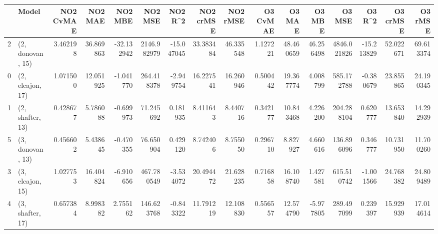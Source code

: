 \begin{tabular}{llrrrrrrrrrrrrrr}
\toprule
{} &             Model &  NO2 CvMAE &    NO2 MAE &    NO2 MBE &      NO2 MSE &    NO2 R\textasciicircum2 &  NO2 crMSE &   NO2 rMSE &  O3 CvMAE &     O3 MAE &     O3 MBE &       O3 MSE &     O3 R\textasciicircum2 &   O3 crMSE &    O3 rMSE \\
\midrule
2 &  (2, donovan, 15) &   3.462198 &  36.869863 & -32.132942 &  2146.982979 & -15.047045 &  33.383484 &  46.335548 &  1.127221 &  48.460659 &  46.256498 &  4846.021826 & -15.213829 &  52.022671 &  69.613374 \\
0 &  (2, elcajon, 17) &   1.071500 &  12.051925 &  -1.041770 &   264.418378 &  -2.949754 &  16.227541 &  16.260946 &  0.500442 &  19.367774 &   4.008799 &   585.172788 &  -0.380679 &  23.855865 &  24.190345 \\
1 &  (2, shafter, 13) &   0.428677 &   5.786088 &  -0.699973 &    71.245692 &   0.181935 &   8.411643 &   8.440716 &  0.342177 &  10.843468 &   4.226200 &   204.288104 &   0.620777 &  13.653840 &  14.292939 \\
5 &  (3, donovan, 13) &   0.456602 &   5.438645 &  -0.470355 &    76.650904 &   0.429120 &   8.742406 &   8.755050 &  0.296710 &   8.827927 &   4.660616 &   136.896096 &   0.346777 &  10.731950 &  11.700260 \\
3 &  (3, elcajon, 15) &   1.027753 &  16.404824 &  -6.910656 &   467.780549 &  -3.534072 &  20.494472 &  21.628235 &  0.716858 &  16.108740 &   1.427581 &   615.510742 &  -1.001566 &  24.768382 &  24.809489 \\
4 &  (3, shafter, 17) &   0.657384 &   8.998382 &   2.755162 &   146.623768 &  -0.843322 &  11.791219 &  12.108830 &  0.556557 &  12.574790 &  -5.977805 &   289.497099 &   0.239397 &  15.929939 &  17.014614 \\
\bottomrule
\end{tabular}
